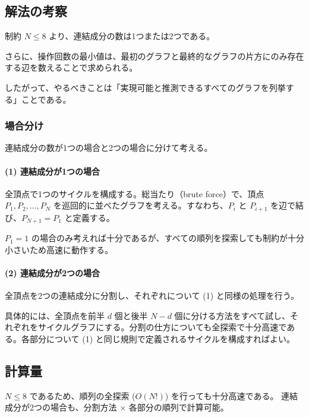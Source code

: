 \documentclass[a4paper,11pt]{ltjsarticle}
\begin{document}
\subsection{解法の考察}

制約 $N \leq 8$ より、連結成分の数は1つまたは2つである。

さらに、操作回数の最小値は、最初のグラフと最終的なグラフの片方にのみ存在する辺を数えることで求められる。

したがって、やるべきことは「実現可能と推測できるすべてのグラフを列挙する」ことである。

\subsubsection{場合分け}

連結成分の数が1つの場合と2つの場合に分けて考える。

\paragraph{(1) 連結成分が1つの場合}

全頂点で1つのサイクルを構成する。総当たり（brute force）で、頂点 $P_1, P_2, \ldots, P_N$ を巡回的に並べたグラフを考える。すなわち、$P_i$ と $P_{i+1}$ を辺で結び、$P_{N+1} = P_1$ と定義する。

$P_1 = 1$ の場合のみ考えれば十分であるが、すべての順列を探索しても制約が十分小さいため高速に動作する。

\paragraph{(2) 連結成分が2つの場合}

全頂点を2つの連結成分に分割し、それぞれについて (1) と同様の処理を行う。

具体的には、全頂点を前半 $d$ 個と後半 $N - d$ 個に分ける方法をすべて試し、それぞれをサイクルグラフにする。分割の仕方についても全探索で十分高速である。各部分について (1) と同じ規則で定義されるサイクルを構成すればよい。

\subsection{計算量}

$N \leq 8$ であるため、順列の全探索 ($O(N!)$) を行っても十分高速である。
連結成分が2つの場合も、分割方法 $\times$ 各部分の順列で計算可能。
\end{document}
